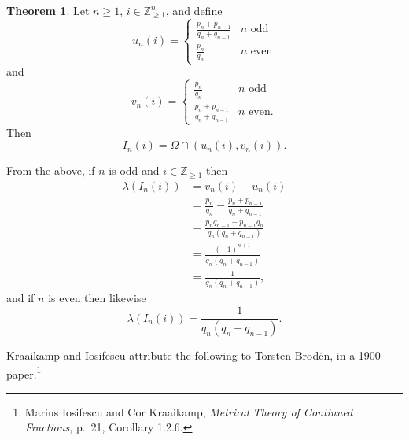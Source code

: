 \documentclass{article}
\theoremstyle{definition}
\newtheorem{theorem}{Theorem}
\theoremstyle{definition}
\begin{document}
\begin{theorem}
Let $n \geq 1$, $i \in \mathbb{Z}_{\geq 1}^n$,
and define
\[
u_n(i) = \begin{cases}
\frac{p_n+p_{n-1}}{q_n+q_{n-1}}&\textrm{$n$ odd}\\
\frac{p_n}{q_n}&\textrm{$n$ even}
\end{cases}
\]
and
\[
v_n(i) = \begin{cases}
\frac{p_n}{q_n}&\textrm{$n$ odd}\\
\frac{p_n+p_{n-1}}{q_n+q_{n-1}}&\textrm{$n$ even}.
\end{cases}
\]
Then
\[
I_n(i) = \Omega \cap (u_n(i),v_n(i)).
\]
\label{cylinder}
\end{theorem}

From the above, if $n$ is odd and $i \in \mathbb{Z}_{\geq 1}$ then 
\begin{align*}
\lambda(I_n(i)) &= v_n(i)-u_n(i)\\
&= \frac{p_n}{q_n}-\frac{p_n+p_{n-1}}{q_n+q_{n-1}}\\
&=\frac{p_nq_{n-1}-p_{n-1}q_n}{q_n(q_n+q_{n-1})}\\
&=\frac{(-1)^{n+1}}{q_n(q_n+q_{n-1})}\\
&=\frac{1}{q_n(q_n+q_{n-1})},
\end{align*}
and if $n$ is even then  likewise
\[
\lambda(I_n(i))=\frac{1}{q_n(q_n+q_{n-1})}.
\]


Kraaikamp and Iosifescu attribute the following to Torsten Brod\'en, in a 1900 paper.\footnote{Marius Iosifescu and Cor Kraaikamp,
{\em Metrical Theory of Continued Fractions}, p.~21, Corollary 1.2.6.}
\end{document}
